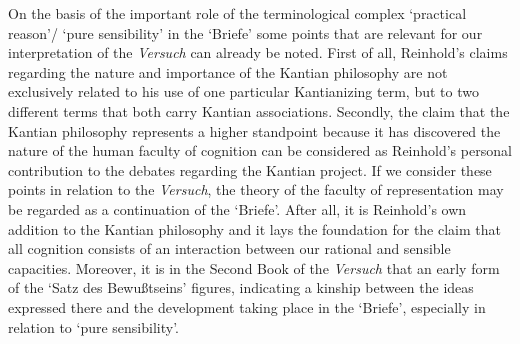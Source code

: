  On the basis of the important role of the terminological complex `practical reason'/ `pure sensibility' in the `Briefe' some points that are relevant for our interpretation of the \textit{Versuch }can already be noted. First of all, Reinhold's claims regarding the nature and importance of the Kantian philosophy are not exclusively related to his use of one particular Kantianizing term, but to two different terms that both carry Kantian associations. Secondly, the claim that the Kantian philosophy represents a higher standpoint because it has discovered the nature of the human faculty of cognition can be considered as Reinhold's personal contribution to the debates regarding the Kantian project. If we consider these points in relation to the \textit{Versuch}, the theory of the faculty of representation may be regarded as a continuation of the `Briefe'. After all, it is Reinhold's own addition to the Kantian philosophy and it lays the foundation for the claim that all cognition consists of an interaction between our rational and sensible capacities. Moreover, it is in the Second Book of the \textit{Versuch} that an early form of the `Satz des Bewu\ss{}tseins' figures, indicating a kinship between the ideas expressed there and the development taking place in the `Briefe', especially in relation to `pure sensibility'. 

